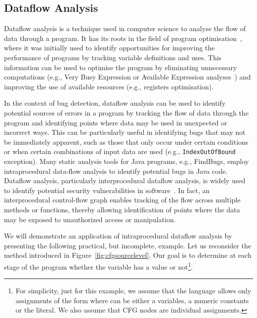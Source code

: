 \subsection{Dataflow Analysis}%
\label{sec:dataflowanalysis}
Dataflow analysis is a technique used in computer science to analyse the flow of
data through a program. It has its roots in the field of program optimisation~\cite{kildall1973dataflow},
where it was initially used to identify opportunities for improving the performance
of programs by tracking variable definitions and uses. This information can be used to optimise the program by eliminating
unnecessary computations (e.g., Very Busy Expression or Available Expression
analyses~\cite{aho2007compilers}) and improving
the use of available resources (e.g., registers optimisation).


In the context of bug detection, dataflow analysis can be used to identify
potential sources of errors in a program by tracking the flow of data through
the program and identifying points where data may be used in unexpected or
incorrect ways. This can be particularly useful in identifying bugs that may
not be immediately apparent, such as those that only occur under certain
conditions or when certain combinations of input data are used (e.g., \texttt{IndexOutOfBound} exception).
Many static analysis tools for Java programs, e.g., FindBugs, employ intraprocedural
data-flow analysis to identify potential bugs in Java code.
Dataflow analysis, particularly interprocedural dataflow analysis, is widely
used to identify potential security vulnerabilities in software~\cite{flowDroid}.
In fact, an interprocedural control-flow graph enables tracking of the flow
across multiple methods or functions, thereby allowing identification of points
where the data may be exposed to unauthorized access or manipulation.

We will demonstrate an application of intraprocedural dataflow analysis by presenting the following
practical, but incomplete, example. Let us reconsider the  method introduced in Figure~\ref{fig:cfgsourcelevel}.
Our goal is to determine at each stage of the program whether the variable 
has a  value or not\footnote{For simplicity, just for this example, we assume that the language
allows only assignments of the form  where  can
be either a  variables, a numeric constants or the  literal. We also assume
that CFG nodes are individual assignments.
}.

